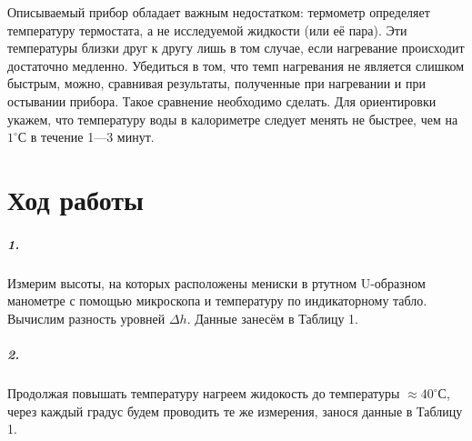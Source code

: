 \documentclass[a4paper,12pt]{article}
\begin{document}
Описываемый прибор обладает важным недостатком: термометр определяет температуру термостата, а не исследуемой жидкости (или её пара). Эти температуры близки друг к другу лишь в том случае, если нагревание происходит достаточно медленно. Убедиться в том, что темп нагревания не является слишком быстрым, можно, сравнивая результаты, полученные при нагревании и при остывании прибора. Такое сравнение необходимо сделать. Для ориентировки укажем, что температуру воды в калориметре следует менять не быстрее, чем на $1^{\circ}$С в течение 1---3 минут. 


\newpage

\section*{Ход работы}

\subparagraph*{1.} Измерим высоты, на которых расположены мениски в ртутном U-образном манометре с помощью микроскопа и температуру по  индикаторному табло. Вычислим разность уровней $\Delta h$. Данные занесём в Таблицу 1. 

\subparagraph*{2.} Продолжая повышать температуру нагреем жидокость до температуры $\approx 40^{\circ}$С,
через каждый градус будем проводить те же измерения, занося данные в Таблицу 1. 
\end{document}
